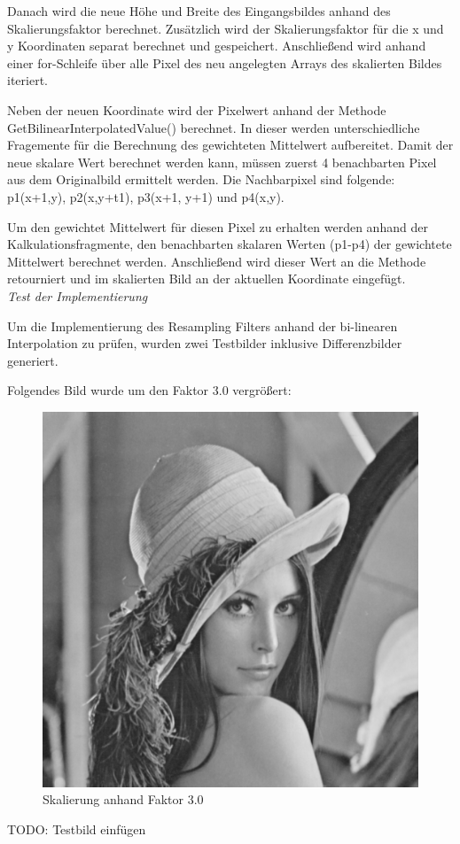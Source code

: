 \documentclass[12pt,german]{article}
\begin{document}
Danach wird die neue Höhe und Breite des Eingangsbildes anhand des Skalierungsfaktor berechnet. Zusätzlich wird der Skalierungsfaktor für die x und y Koordinaten separat berechnet und gespeichert. Anschließend wird anhand einer for-Schleife über alle Pixel des neu angelegten Arrays des skalierten Bildes iteriert. 

Neben der neuen Koordinate wird der Pixelwert anhand der Methode GetBilinearInterpolatedValue() berechnet. In dieser werden unterschiedliche Fragemente für die Berechnung des gewichteten Mittelwert aufbereitet. Damit der neue skalare Wert berechnet werden kann, müssen zuerst 4 benachbarten Pixel aus dem Originalbild ermittelt werden. Die Nachbarpixel sind folgende: p1(x+1,y), p2(x,y+t1), p3(x+1, y+1) und p4(x,y). 


Um den gewichtet Mittelwert für diesen Pixel zu erhalten werden anhand der Kalkulationsfragmente, den benachbarten skalaren Werten (p1-p4) der gewichtete Mittelwert berechnet werden. Anschließend wird dieser Wert an die Methode retourniert und im skalierten Bild an der aktuellen Koordinate eingefügt.\\

\textit{Test der Implementierung}

Um die Implementierung des Resampling Filters anhand der bi-linearen Interpolation zu prüfen, wurden zwei Testbilder inklusive Differenzbilder generiert.

Folgendes Bild wurde um den Faktor 3.0 vergrößert:

\begin{figure}[H]
	\centering
	\includegraphics[width=12cm]{images/scaled-img-bilinear-interpolation-3.jpg}
	\caption{Skalierung anhand Faktor 3.0}
	\label{fig:resultResamplingBilinearInterpolation-3.0}
\end{figure}
TODO: Testbild einfügen
\end{document}
